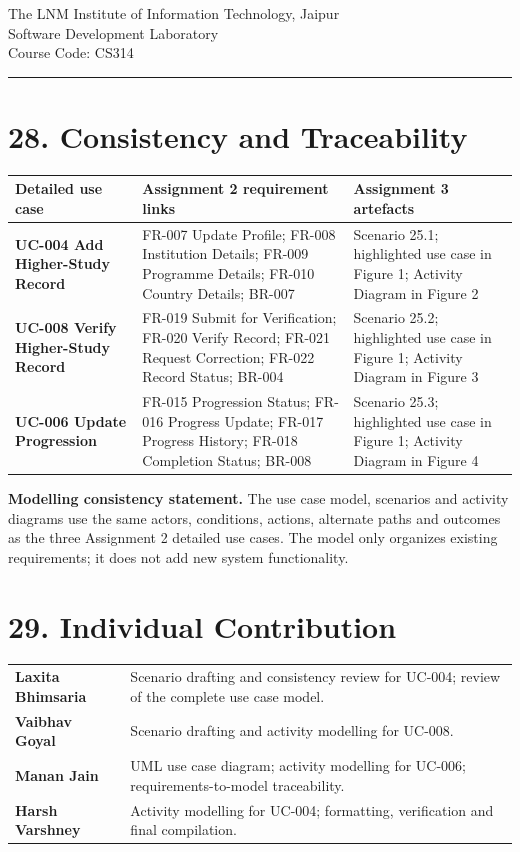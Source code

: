\documentclass[12pt,a4paper]{article}
\newcommand{\docheader}{%
\begin{center}\small The LNM Institute of Information Technology, Jaipur\\
Software Development Laboratory\\Course Code: CS314\end{center}\vspace{-3pt}\hrule\vspace{10pt}}
\newcommand{\sectionnum}[1]{\section*{#1}}
\begin{document}
\newpage
\docheader
\sectionnum{28. Consistency and Traceability}
\begin{tabularx}{\textwidth}{>{\bfseries}p{2.0cm} p{3.4cm} X}
Detailed use case & Assignment 2 requirement links & Assignment 3 artefacts\\ \midrule
UC-004 Add Higher-Study Record & FR-007 Update Profile; FR-008 Institution Details; FR-009 Programme Details; FR-010 Country Details; BR-007 & Scenario 25.1; highlighted use case in Figure 1; Activity Diagram in Figure 2\\
UC-008 Verify Higher-Study Record & FR-019 Submit for Verification; FR-020 Verify Record; FR-021 Request Correction; FR-022 Record Status; BR-004 & Scenario 25.2; highlighted use case in Figure 1; Activity Diagram in Figure 3\\
UC-006 Update Progression & FR-015 Progression Status; FR-016 Progress Update; FR-017 Progress History; FR-018 Completion Status; BR-008 & Scenario 25.3; highlighted use case in Figure 1; Activity Diagram in Figure 4\\
\end{tabularx}

\vspace{10pt}
\textbf{Modelling consistency statement.} The use case model, scenarios and activity diagrams use the same actors, conditions, actions, alternate paths and outcomes as the three Assignment 2 detailed use cases. The model only organizes existing requirements; it does not add new system functionality.

\sectionnum{29. Individual Contribution}
\begin{tabularx}{\textwidth}{>{\bfseries}p{3.4cm} X}
Laxita Bhimsaria & Scenario drafting and consistency review for UC-004; review of the complete use case model.\\
Vaibhav Goyal & Scenario drafting and activity modelling for UC-008.\\
Manan Jain & UML use case diagram; activity modelling for UC-006; requirements-to-model traceability.\\
Harsh Varshney & Activity modelling for UC-004; formatting, verification and final compilation.\\
\end{tabularx}

\vfill
\end{document}
